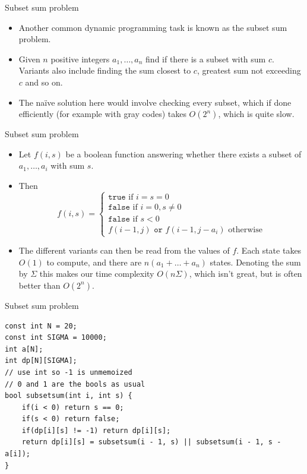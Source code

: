 \documentclass{beamer}
\begin{document}
\begin{frame}[plain]{Subset sum problem}
    \vspace{10pt}

    \begin{itemize}
        \item Another common dynamic programming task is known as the subset sum problem. 
        
        \item Given $n$ positive integers $a_1, \dots, a_n$ find if there is a subset with sum $c$. Variants also include finding the sum closest to $c$, greatest sum not exceeding $c$ and so on.
        
        \item The naïve solution here would involve checking every subset, which if done efficiently (for example with gray codes) takes $O(2^n)$, which is quite slow.
    \end{itemize}
\end{frame}

\begin{frame}[plain]{Subset sum problem}
    \vspace{10pt}

    \begin{itemize}
        \item Let $f(i, s)$ be a boolean function answering whether there exists a subset of $a_1, \dots, a_i$ with sum $s$.
        
        \item Then      
        \[f(i, s) = \begin{cases}\texttt{true} \text{ if } i = s = 0 \\ \texttt{false} \text{ if } i = 0, s \neq 0 \\ \texttt{false} \text{ if } s < 0 \\ f(i - 1, j) \texttt{ or } f(i - 1, j - a_i) \text{ otherwise} \end{cases}\]
        
        \item The different variants can then be read from the values of $f$. Each state takes $O(1)$ to compute, and there are $n(a_1 + \dots + a_n)$ states. Denoting the sum by $\Sigma$ this makes our time complexity $O(n\Sigma)$, which isn't great, but is often better than $O(2^n)$.
    \end{itemize}
\end{frame}

\begin{frame}{Subset sum problem}
    \begin{verbatim}
const int N = 20;
const int SIGMA = 10000;
int a[N];
int dp[N][SIGMA]; 
// use int so -1 is unmemoized
// 0 and 1 are the bools as usual
bool subsetsum(int i, int s) {
    if(i < 0) return s == 0;
    if(s < 0) return false;
    if(dp[i][s] != -1) return dp[i][s];
    return dp[i][s] = subsetsum(i - 1, s) || subsetsum(i - 1, s - a[i]);
}
    \end{verbatim}
\end{frame}
\end{document}
